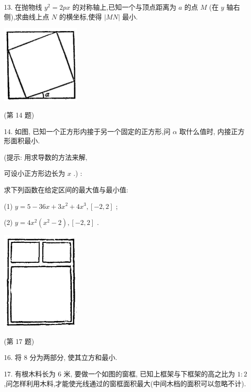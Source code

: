 \documentclass[10pt]{article}
\begin{document}
13. 在抛物线 \({y}^{2} = {2px}\) 的对称轴上,已知一个与顶点距离为 \(a\) 的点 \(M\) (在 \(y\) 轴右侧),求曲线上点 \(N\) 的横坐标,使得 \(\left| {MN}\right|\) 最小.

\begin{center}
\includegraphics[max width=0.3\textwidth]{images/01912c18-5c3f-733d-b775-749ba9897a9d_156_776700.jpg}
\end{center}

(第 14 题)

14. 如图, 已知一个正方形内接于另一个固定的正方形,问 \(\alpha\) 取什么值时, 内接正方形面积最小.

(提示: 用求导数的方法来解,

可设小正方形边长为 \(x\) .) :

求下列函数在给定区间的最大值与最小值:

(1) \(y = 5 - {36x} + 3{x}^{2} + 4{x}^{3},\left\lbrack {-2,2}\right\rbrack\) ;

(2) \(y = 4{x}^{2}\left( {{x}^{2} - 2}\right) ,\left\lbrack {-2,2}\right\rbrack\) .

\begin{center}
\includegraphics[max width=0.3\textwidth]{images/01912c18-5c3f-733d-b775-749ba9897a9d_157_303198.jpg}
\end{center}

(第 17 题)

16. 将 8 分为两部分, 使其立方和最小.

17. 有根木料长为 6 米, 要做一个如图的窗框, 已知上框架与下框架的高之比为 \(1 : 2\) ,问怎样利用木料,才能使光线通过的窗框面积最大(中间木档的面积可以忽略不计).
\end{document}
